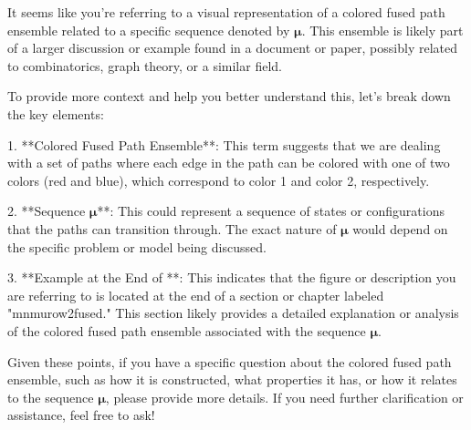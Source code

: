 It seems like you're referring to a visual representation of a colored fused path ensemble related to a specific sequence denoted by \(\bm{\mu}\). This ensemble is likely part of a larger discussion or example found in a document or paper, possibly related to combinatorics, graph theory, or a similar field.

To provide more context and help you better understand this, let's break down the key elements:

1. **Colored Fused Path Ensemble**: This term suggests that we are dealing with a set of paths where each edge in the path can be colored with one of two colors (red and blue), which correspond to color 1 and color 2, respectively.

2. **Sequence \(\bm{\mu}\)**: This could represent a sequence of states or configurations that the paths can transition through. The exact nature of \(\bm{\mu}\) would depend on the specific problem or model being discussed.

3. **Example at the End of **: This indicates that the figure or description you are referring to is located at the end of a section or chapter labeled "mnmurow2fused." This section likely provides a detailed explanation or analysis of the colored fused path ensemble associated with the sequence \(\bm{\mu}\).

Given these points, if you have a specific question about the colored fused path ensemble, such as how it is constructed, what properties it has, or how it relates to the sequence \(\bm{\mu}\), please provide more details. If you need further clarification or assistance, feel free to ask!